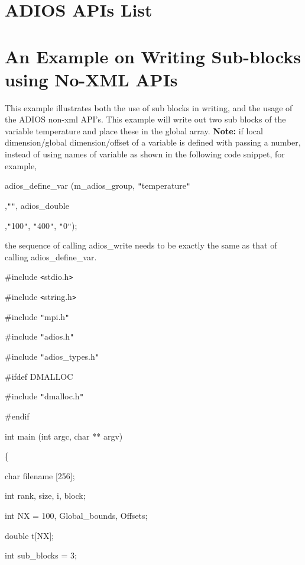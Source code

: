 \section{ADIOS APIs List}



\section{An Example on Writing Sub-blocks using No-XML APIs}
\label{section-appendix-writing-subblocks}

This example illustrates both the use of sub blocks in writing, and the usage of 
the ADIOS non-xml API's. This example will write out two sub blocks of the variable 
temperature and place these in the global array. \textbf{Note:} if local dimension/global 
dimension/offset of a variable is defined with passing a number, instead of using 
names of variable as shown in the following code snippet, for example,

adios\_define\_var (m\_adios\_group, \texttt{"}temperature\texttt{"}

\parindent=86pt
,\texttt{"}\texttt{"}, adios\_double

,\texttt{"}100\texttt{"}, \texttt{"}400\texttt{"}, \texttt{"}0\texttt{"});

\parindent=0pt
the sequence of calling adios\_write needs to be exactly the same as that of calling 
adios\_define\_var.

\#include \texttt{<}stdio.h\texttt{>}

\#include \texttt{<}string.h\texttt{>}

\#include \texttt{"}mpi.h\texttt{"}

\#include \texttt{"}adios.h\texttt{"}

\#include \texttt{"}adios\_types.h\texttt{"}

\#ifdef DMALLOC

\#include \texttt{"}dmalloc.h\texttt{"}

\#endif

int main (int argc, char ** argv)

\{

\parindent=28pt
char        filename [256];

int         rank, size, i, block;

\parindent=57pt
int         NX = 100, Global\_bounds, Offsets;

\parindent=28pt
double      t[NX];

int         sub\_blocks = 3;

